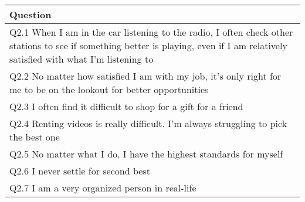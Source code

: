 
\begin{tabular}{l}
\hline
Question \\
\hline
Q2.1 When I am in the car listening to the radio, I often check other stations to see if something better is playing, even if I am relatively satisfied with what I’m listening to\\
Q2.2 No matter how satisfied I am with my job, it’s only right for me to be on the lookout for better opportunities\\
Q2.3 I often find it difficult to shop for a gift for a friend\\
Q2.4 Renting videos is really difficult. I’m always struggling to pick the best one\\
Q2.5 No matter what I do, I have the highest standards for myself\\
Q2.6 I never settle for second best\\
Q2.7 I am a very organized person in real-life \\
\hline
\end{tabular}
